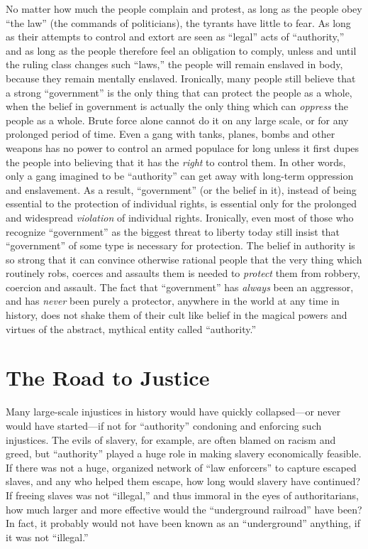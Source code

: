 \documentclass{book}
\begin{document}
No matter how much the people complain and protest, as long as the people obey \enquote{the law} (the commands of politicians), the tyrants have little to fear. As long as their attempts to control and extort are seen as \enquote{legal} acts of \enquote{authority,} and as long as the people therefore feel an obligation to comply, unless and until the ruling class changes such \enquote{laws,} the people will remain enslaved in body, because they remain mentally enslaved. Ironically, many people still believe that a strong \enquote{government} is the only thing that can protect the people as a whole, when the belief in government is actually the only thing which can \emph{oppress} the people as a whole. Brute force alone cannot do it on any large scale, or for any prolonged period of time. Even a gang with tanks, planes, bombs and other weapons has no power to control an armed populace for long unless it first dupes the people into believing that it has the \emph{right} to control them. In other words, only a gang imagined to be \enquote{authority} can get away with long-term oppression and enslavement. As a result, \enquote{government} (or the belief in it), instead of being essential to the protection of individual rights, is essential only for the prolonged and widespread \emph{violation} of individual rights. Ironically, even most of those who recognize \enquote{government} as the biggest threat to liberty today still insist that \enquote{government} of some type is necessary for protection. The belief in authority is so strong that it can convince otherwise rational people that the very thing which routinely robs, coerces and assaults them is needed to \emph{protect} them from robbery, coercion and assault. The fact that \enquote{government} has \emph{always} been an aggressor, and has \emph{never} been purely a protector, anywhere in the world at any time in history, does not shake them of their cult like belief in the magical powers and virtues of the abstract, mythical entity called \enquote{authority.}

\section{The Road to Justice}

Many large-scale injustices in history would have quickly collapsed---or never would have started---if not for \enquote{authority} condoning and enforcing such injustices. The evils of slavery, for example, are often blamed on racism and greed, but \enquote{authority} played a huge role in making slavery economically feasible. If there was not a huge, organized network of \enquote{law enforcers} to capture escaped slaves, and any who helped them escape, how long would slavery have continued? If freeing slaves was not \enquote{illegal,} and thus immoral in the eyes of authoritarians, how much larger and more effective would the \enquote{underground railroad} have been? In fact, it probably would not have been known as an \enquote{underground} anything, if it was not \enquote{illegal.}
\end{document}
